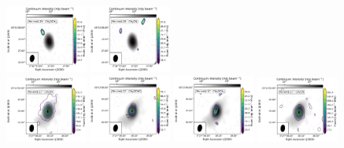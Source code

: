 \begin{figure}[htbp!]
  \includegraphics[width=0.24\textwidth]{./moment0/Set1_ID05_CH3OCH3_259311.pdf}
  \includegraphics[width=0.24\textwidth]{./moment0/Set1_ID05_CH3CN_257527.pdf}
  \\
  \includegraphics[width=0.24\textwidth]{./moment0/Set1_ID06_CH3OH_243915.pdf}
  \includegraphics[width=0.24\textwidth]{./moment0/Set1_ID06_CH3OCHO_259342.pdf}
  \includegraphics[width=0.24\textwidth]{./moment0/Set1_ID06_CH3OCH3_259311.pdf}
  \includegraphics[width=0.24\textwidth]{./moment0/Set1_ID06_CH3CN_257527.pdf}
  \\
  \caption{}
\end{figure}
\addtocounter{figure}{-1}
